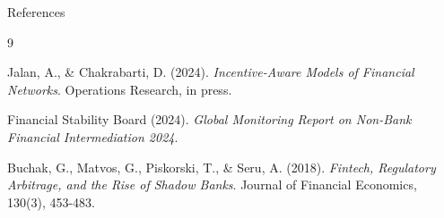 \documentclass[aspectratio=169]{beamer}
\begin{document}
\appendix

\begin{frame}[allowframebreaks]{References}
\begin{thebibliography}{9}

Jalan, A., \& Chakrabarti, D. (2024). 
\textit{Incentive-Aware Models of Financial Networks}. 
Operations Research, in press.

Financial Stability Board (2024).
\textit{Global Monitoring Report on Non-Bank Financial Intermediation 2024}.

Buchak, G., Matvos, G., Piskorski, T., \& Seru, A. (2018).
\textit{Fintech, Regulatory Arbitrage, and the Rise of Shadow Banks}.
Journal of Financial Economics, 130(3), 453-483.

\end{thebibliography}
\end{frame}
\end{document}
